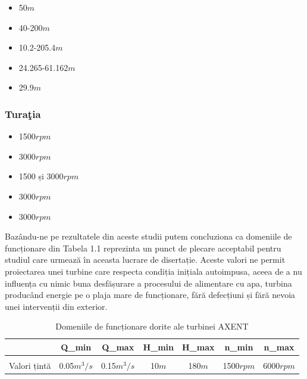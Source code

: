 \begin{itemize}
	\item 50$\si{m}$ \cite{gentner2000experimentelle}
	\item 40-200$\si{m}$ \cite{GREES_2014}
	\item 10.2-205.4$\si{m}$ \cite{susanhub}
	\item 24.265-61.162$\si{m}$ \cite{biner2016engineering}
	\item 29.9$\si{m}$ \cite{hasmatuchi2014new}
\end{itemize}


\subsubsection{Tura\c{t}ia}

\begin{itemize}
	\item 1500$\si{rpm}$ \cite{gentner2000experimentelle}
	\item 3000$\si{rpm}$ \cite{GREES_2014}
	\item 1500 și 3000$\si{rpm}$ \cite{susanhub}
	\item 3000$\si{rpm}$ \cite{biner2016engineering}
	\item 3000$\si{rpm}$ \cite{hasmatuchi2014new}
\end{itemize}

Bazându-ne pe rezultatele din aceste studii putem concluziona ca domeniile de funcționare din Tabela 1.1 reprezinta un punct de plecare acceptabil pentru studiul care urmează în aceasta lucrare de disertație. Aceste valori ne permit proiectarea unei turbine care respecta condiția inițiala autoimpusa, aceea de a nu influența cu nimic buna desfășurare a procesului de alimentare cu apa, turbina producând energie pe o plaja mare de funcționare, fără defecțiuni și fără nevoia unei intervenții din exterior.\\

\begin{table}[ht]
\caption{Domeniile de funcționare dorite ale turbinei AXENT \cite{neipp2017zweistufige}}%
\centering

\begin{tabular}{ c | c | c | c | c | c | c }
            & Q_{min}          & Q_{max}          & H_{min}    & H_{max}     & n_{min}        & n_{max} \\ \hline
&&&&&&\\[-0.5em]
Valori țintă  & 0.05$\si{m^3/s}$ & 0.15$\si{m^3/s}$ & 10$\si{m}$ & 180$\si{m}$ & 1500$\si{rpm}$ & 6000$\si{rpm}$ \\
\end{tabular}

\end{table}

\clearpage